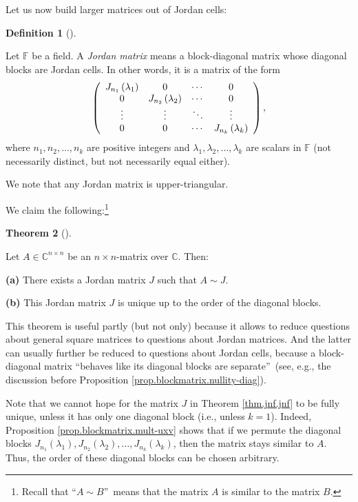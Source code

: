 \documentclass[numbers=enddot,12pt,final,onecolumn,notitlepage]{scrartcl}%
\numberwithin{exer}{subsection}
\theoremstyle{definition}
\newtheorem{theo}{Theorem}[subsection]
\newenvironment{theorem}[1][]
{\begin{theo}[#1]\begin{leftbar}}
{\end{leftbar}\end{theo}}
\newtheorem{defi}[theo]{Definition}
\newenvironment{definition}[1][]
{\begin{defi}[#1]\begin{leftbar}}
{\end{leftbar}\end{defi}}
\begin{document}
Let us now build larger matrices out of Jordan cells:

\begin{definition}
\label{def.jnf.jmat}Let $\mathbb{F}$ be a field. A \emph{Jordan matrix} means
a block-diagonal matrix whose diagonal blocks are Jordan cells. In other
words, it is a matrix of the form%
\[
\left(
\begin{array}
[c]{cccc}%
J_{n_{1}}\left(  \lambda_{1}\right)  & 0 & \cdots & 0\\
0 & J_{n_{2}}\left(  \lambda_{2}\right)  & \cdots & 0\\
\vdots & \vdots & \ddots & \vdots\\
0 & 0 & \cdots & J_{n_{k}}\left(  \lambda_{k}\right)
\end{array}
\right)  ,
\]
where $n_{1},n_{2},\ldots,n_{k}$ are positive integers and $\lambda
_{1},\lambda_{2},\ldots,\lambda_{k}$ are scalars in $\mathbb{F}$ (not
necessarily distinct, but not necessarily equal either).
\end{definition}

We note that any Jordan matrix is upper-triangular. \medskip

We claim the following:\footnote{Recall that \textquotedblleft$A\sim
B$\textquotedblright\ means that the matrix $A$ is similar to the matrix $B$.}

\begin{theorem}
[Jordan canonical form theorem]\label{thm.jnf.jnf}Let $A\in\mathbb{C}^{n\times
n}$ be an $n\times n$-matrix over $\mathbb{C}$. Then: \medskip

\textbf{(a)} There exists a Jordan matrix $J$ such that $A\sim J$. \medskip

\textbf{(b)} This Jordan matrix $J$ is unique up to the order of the diagonal blocks.
\end{theorem}

This theorem is useful partly (but not only) because it allows to reduce
questions about general square matrices to questions about Jordan matrices.
And the latter can usually further be reduced to questions about Jordan cells,
because a block-diagonal matrix \textquotedblleft behaves like its diagonal
blocks are separate\textquotedblright\ (see, e.g., the discussion before
Proposition \ref{prop.blockmatrix.nullity-diag}).

Note that we cannot hope for the matrix $J$ in Theorem \ref{thm.jnf.jnf} to be
fully unique, unless it has only one diagonal block (i.e., unless $k=1$).
Indeed, Proposition \ref{prop.blockmatrix.mult-uxv} shows that if we permute
the diagonal blocks $J_{n_{1}}\left(  \lambda_{1}\right)  ,J_{n_{2}}\left(
\lambda_{2}\right)  ,\ldots,J_{n_{k}}\left(  \lambda_{k}\right)  $, then the
matrix stays similar to $A$. Thus, the order of these diagonal blocks can be
chosen arbitrary.
\end{document}
